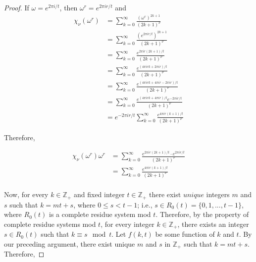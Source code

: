 \documentclass[../article.tex]{subfiles}
\begin{document}
\begin{proof}
If $\omega = e^{2\pi i/t}$, then $\omega^r = e^{2 \pi i r/t}$ and
\begin{equation}
\begin{split}
\chi_{\nu}(\omega^{r}) &= \sum_{k=0}^{\infty} \frac{(\omega^r)^{2k+1}}{(2k+1)^{\nu}} \\
&= \sum_{k=0}^{\infty} \frac{(e^{2 \pi i r/t})^{2k+1}}{(2k+1)^{\nu}} \\
&= \sum_{k=0}^{\infty} \frac{e^{2 \pi i r(2k+1)/t}}{(2k+1)^{\nu}} \\
&= \sum_{k=0}^{\infty} \frac{e^{(4 \pi irk +2\pi i r)/t}}{(2k+1)^{\nu}} \\
&= \sum_{k=0}^{\infty} \frac{e^{(4 \pi irk +4 \pi ir - 2\pi i r)/t}}{(2k+1)^{\nu}} \\
&= \sum_{k=0}^{\infty} \frac{e^{(4 \pi irk +4 \pi ir)/t}e^{- 2\pi i r/t}}{(2k+1)^{\nu}} \\
&= e^{- 2\pi i r/t} \sum_{k=0}^{\infty} \frac{e^{4 \pi i r(k+1)/t}}{(2k+1)^{\nu}}
\end{split}
\end{equation}

Therefore,

\begin{equation}
\begin{split}
\chi_{\nu}(\omega^r)\omega^r &= \sum_{k=0}^{\infty} \frac{e^{2 \pi i r(2k+1)/t} \cdot e^{2 \pi i r/t}}{(2k+1)^{\nu}} \\
&= \sum_{k=0}^{\infty} \frac{e^{4 \pi i r(k+1)/t}}{(2k+1)^{\nu}} \\
\end{split}
\end{equation}

Now, for every $k \in \mathbb{Z}_{+}$ and fixed integer $t \in \mathbb{Z}_{+}$ there exist $unique$ integers $m$ and $s$ such that $k = mt +s$, where $0 \leq s < t-1$; i.e., $s \in R_{0}(t) = \{0, 1, ..., t-1\}$, where $R_{0}(t)$ is a complete residue system mod $t$. Therefore, by the property of complete residue systems mod $t$, for every integer $k \in \mathbb{Z}_{+}$, there exists an integer $s \in R_{0}(t)$ such that $k \equiv s \mod t$. Let $f(k,t)$ be some function of $k$ and $t$. By our preceding argument, there exist unique $m$ and $s$ in $\mathbb{Z}_{+}$ such that $k = mt +s$. Therefore,


\end{proof}
\end{document}
